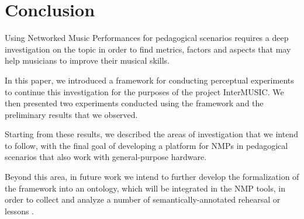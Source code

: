 
\section{Conclusion}\label{sec:conclusion}

Using Networked Music Performances for pedagogical scenarios requires a deep investigation on the topic in order to find metrics, factors and aspects that may help musicians to improve their musical skills.

In this paper, we introduced a framework for conducting perceptual experiments to continue this investigation for the purposes of the project InterMUSIC. We then presented two experiments conducted using the framework and the preliminary results that we observed.

Starting from these results, we described the areas of investigation that we intend to follow, with the final goal of developing a platform for NMPs in pedagogical scenarios that also work with general-purpose hardware.

Beyond this area, in future work we intend to further develop the formalization of the framework into an ontology, which will be integrated in the NMP tools, in order to collect and analyze a number of semantically-annotated rehearsal or lessons \cite{Kolazi2013}. 